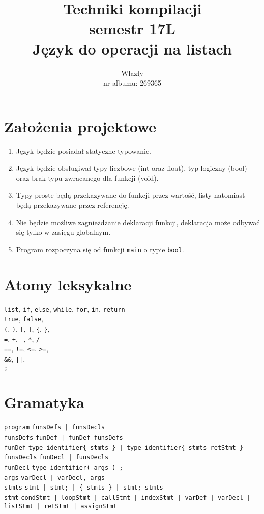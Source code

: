 \documentclass{article}
\title{\vspace{7cm}\LARGE Techniki kompilacji\\semestr 17L\\Język do operacji na listach}
\author{\LargeŁukasz Wlazły\\nr albumu: 269365}
\date{}
\newcommand{\keyword}[1]{\colorbox{light-gray}{\texttt{#1}}}
\newcommand{\code}[1]{\texttt{#1}}
\begin{document}
\maketitle
{}
\newpage
{}

\section{Założenia projektowe}
\begin{enumerate}
\item Język będzie posiadał statyczne typowanie.
\item Język będzie obsługiwał typy liczbowe (int oraz float), typ logiczny (bool) oraz brak typu zwracanego dla funkcji (void).
\item Typy proste będą przekazywane do funkcji przez wartość, listy natomiast będą przekazywane przez referencję.
\item Nie będzie możliwe zagnieżdżanie deklaracji funkcji, deklaracja może odbywać się tylko w zasięgu globalnym.
\item Program rozpoczyna się od funkcji \code{main} o typie \keyword{bool}.
\end{enumerate}

\section{Atomy leksykalne}
\keyword{list}, \keyword{if}, \keyword{else}, \keyword{while}, \keyword{for}, \keyword{in}, \keyword{return}\\
\keyword{true}, \keyword{false}, \\
\keyword{(}, \keyword{)}, \keyword{[}, \keyword{]}, \keyword{\{}, \keyword{\}}, \\
\keyword{=}, \keyword{+}, \keyword{-}, \keyword{*}, \keyword{/} \\
\keyword{==}, \keyword{!=}, \keyword{<=}, \keyword{>=}, \\
\keyword{\&\&}, \keyword{||}, \\
\keyword{;}
\newpage
\section{Gramatyka}
\code{program} \textrightarrow \code{funsDefs | funsDecls} \\
\code{funsDefs} \textrightarrow \code{funDef | funDef funsDefs} \\
\code{funDef} \textrightarrow \code{type identifier\{ stmts \} | type identifier\{ stmts retStmt \}} \\
\code{funsDecls} \textrightarrow \code{funDecl | funsDecls} \\
\code{funDecl} \textrightarrow \code{type identifier( args ) \keyword{;}} \\
\code{args} \textrightarrow \code{varDecl | varDecl, args} \\
\code{stmts} \textrightarrow \code{stmt | stmt\keyword{;} | \keyword{\{} stmts \keyword{\}} | stmt\keyword{;} stmts} \\
\code{stmt} \textrightarrow \code{condStmt | loopStmt | callStmt | indexStmt | varDef | varDecl | listStmt | retStmt | assignStmt} \\
\end{document}
